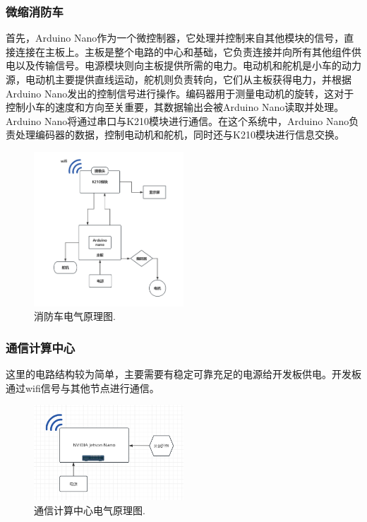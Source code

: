 \documentclass[12pt, a4paper, oneside]{article}
\begin{document}
\subsubsection{微缩消防车}

首先，Arduino Nano作为一个微控制器，它处理并控制来自其他模块的信号，直接连接在主板上。主板是整个电路的中心和基础，它负责连接并向所有其他组件供电以及传输信号。电源模块则向主板提供所需的电力。电动机和舵机是小车的动力源，电动机主要提供直线运动，舵机则负责转向，它们从主板获得电力，并根据Arduino Nano发出的控制信号进行操作。编码器用于测量电动机的旋转，这对于控制小车的速度和方向至关重要，其数据输出会被Arduino Nano读取并处理。Arduino Nano将通过串口与K210模块进行通信。在这个系统中，Arduino Nano负责处理编码器的数据，控制电动机和舵机，同时还与K210模块进行信息交换。

\begin{figure}[H]
    \centering
    \includegraphics[width=0.5\textwidth]{image-3.png}
    \caption{消防车电气原理图.}
    \label{消防车电气原理图}
\end{figure}


\subsubsection{通信计算中心}

这里的电路结构较为简单，主要需要有稳定可靠充足的电源给开发板供电。开发板通过wifi信号与其他节点进行通信。

\begin{figure}[H]
    \centering
    \includegraphics[width=0.5\textwidth]{image-2.png}
    \caption{通信计算中心电气原理图.}
    \label{通信计算中心电气原理图}
\end{figure}
\end{document}
